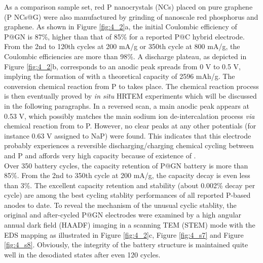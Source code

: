 As a comparison sample set, red P nanocrystals (NCs) placed on pure graphene (P NCs@G) were also manufactured by grinding of nanoscale red phosphorus and graphene. As shown in Figure \ref{fig:4_2}a, the initial Coulombic efficiency of P@GN is 87\%, higher than that of 85\% for a reported P@C hybrid electrode.\cite{Li2013c} 
From the 2nd to 120th cycles at 200 mA/g or 350th cycle at 800 mA/g, the Coulombic efficiencies are more than 98\%. A discharge plateau, as depicted in Figure \ref{fig:4_2}b, corresponds to an anodic peak spreads from 0 V to 0.5 V, implying the formation of  with a theoretical capacity of 2596 mAh/g. The conversion chemical reaction from P to  takes place. 
The chemical reaction process is then eventually proved by {\em in situ} HRTEM experiments which will be discussed in the following paragraphs. In a reversed scan, a main anodic peak appears at 0.53 V, which possibly matches the main sodium ion de-intercalation process \textit{via} chemical reaction from  to P. However, no clear peaks at any other potentials (for instance 0.63 V assigned to NaP) were found. This indicates that this electrode probably experiences a reversible discharging/charging chemical cycling between  and P and affords very high capacity because of existence of . \\

Over 350 battery cycles, the capacity retention of P@GN battery is more than 85\%. From the 2nd to 350th cycle at 200 mA/g, the capacity decay is even less than 3\%. 
The excellent capacity retention and stability (about 0.002\% decay per cycle) are among the best cycling stablity performances of all reported P-based anodes to date. 
To reveal the mechanism of the unusual cyclic stablity, the original and after-cycled P@GN electrodes were examined by a high angular annual dark field (HAADF) imaging in a scanning TEM (STEM) mode with the EDS mapping as illustrated in Figure \ref{fig:4_2}c, Figure \ref{fig:4_s7} and Figure \ref{fig:4_s8}. 
Obviously, the integrity of the battery structure is maintained quite well in the desodiated states after even 120 cycles. 


